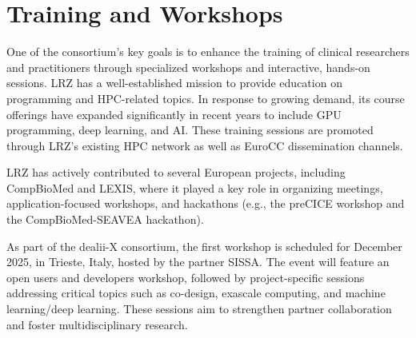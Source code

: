 \documentclass[a4paper,12pt]{article}
\begin{document}
\section{Training and Workshops}

One of the consortium’s key goals is to enhance the training of clinical
researchers and practitioners through specialized workshops and interactive,
hands-on sessions. LRZ has a well-established mission to provide education on
programming and HPC-related topics. In response to growing demand, its course
offerings have expanded significantly in recent years to include GPU
programming, deep learning, and AI. These training sessions are promoted
through LRZ’s existing HPC network as well as EuroCC dissemination channels.

LRZ has actively contributed to several European projects, including
CompBioMed and LEXIS, where it played a key role in organizing meetings,
application-focused workshops, and hackathons (e.g., the preCICE workshop and
the CompBioMed-SEAVEA hackathon).

As part of the dealii-X consortium, the first workshop is scheduled for
December 2025, in Trieste, Italy, hosted by the partner SISSA. The event will
feature an open users and developers workshop, followed by project-specific
sessions addressing critical topics such as co-design, exascale computing, and
machine learning/deep learning. These sessions aim to strengthen partner
collaboration and foster multidisciplinary research.

\label{MyLastPage}
\end{document}
